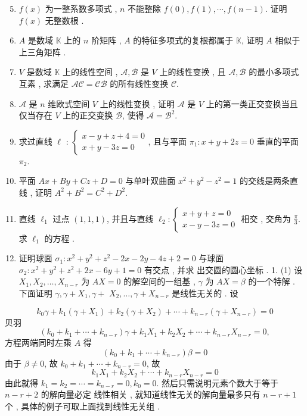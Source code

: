 \documentclass[10pt]{article}
\begin{document}
\begin{enumerate}
  \setcounter{enumi}{4}
  \item $f(x)$  为一整系数多项式 , $n$  不能整除  $f(0), f(1), \cdots, f(n-1)$.  证明  $f(x)$  无整数根 .

  \item $A$  是数域  $\mathbb{K}$  上的  $n$  阶矩阵 , $A$  的特征多项式的复根都属于  $\mathbb{K}$,  证明  $A$  相似于上三角矩阵 .

  \item $V$  是数域  $\mathbb{K}$  上的线性空间 , $\mathscr{A}, \mathscr{B}$  是  $V$  上的线性变换 ,  且  $\mathscr{A}, \mathscr{B}$  的最小多项式互素 ,  求满足  $\mathscr{A} \mathscr{C}=\mathscr{C} \mathscr{B}$  的所有线性变换  $\mathscr{C}$.

  \item $\mathscr{A}$  是  $n$  维欧式空间  $V$  上的线性变换 ,  证明  $\mathscr{A}$  是  $V$  上的第一类正交变换当且仅当存在  $V$  上的正交变换  $\mathscr{B}$,  使得  $\mathscr{A}=\mathscr{B}^{2}$.

  \item  求过直线  $\ell$ : $\left\{\begin{array}{c}x-y+z+4=0 \\ x+y-3 z=0\end{array}\right.$,  且与平面  $\pi_{1}: x+y+2 z=0$  垂直的平面  $\pi_{2}$.

  \item  平面  $A x+B y+C z+D=0$  与单叶双曲面  $x^{2}+y^{2}-z^{2}=1$  的交线是两条直线 ,  证明  $A^{2}+B^{2}=C^{2}+D^{2}$.

  \item  直线  $\ell_{1}$  过点  $(1,1,1)$,  并且与直线  $\ell_{2}:\left\{\begin{array}{c}x+y+z=0 \\ x-y-3 z=0\end{array}\right.$  相交 ,  交角为  $\frac{\pi}{3}$.  求  $\ell_{1}$  的方程 .

  \item  证明球面  $\sigma_{1}: x^{2}+y^{2}+z^{2}-2 x-2 y-4 z+2=0$  与球面  $\sigma_{2}: x^{2}+y^{2}+z^{2}+2 x-6 y+1=0$  有交点 ,  并求   出交圆的圆心坐标 . 1. (1)  设  $X_{1}, X_{2}, \ldots, X_{n-r}$  为  $A X=0$  的解空间的一组基 , $\gamma$  为  $A X=\beta$  的一个特解 .  下面证明  $\gamma, \gamma+X_{1}, \gamma+$ $X_{2}, \ldots, \gamma+X_{n-r}$  是线性无关的 .  设 

\end{enumerate}
$$
k_{0} \gamma+k_{1}\left(\gamma+X_{1}\right)+k_{2}\left(\gamma+X_{2}\right)+\cdots+k_{n-r}\left(\gamma+X_{n-r}\right)=0
$$
 贝羽 
$$
\left(k_{0}+k_{1}+\cdots+k_{n-r}\right) \gamma+k_{1} X_{1}+k_{2} X_{2}+\cdots+k_{n-r} X_{n-r}=0,
$$
 方程两端同时左乘  $A$  得 
$$
\left(k_{0}+k_{1}+\cdots+k_{n-r}\right) \beta=0
$$
 由于  $\beta \neq 0$,  故  $k_{0}+k_{1}+\cdots+k_{n-r}=0$,  故 
$$
k_{1} X_{1}+k_{2} X_{2}+\cdots+k_{n-r} X_{n-r}=0
$$
 由此就得  $k_{1}=k_{2}=\cdots=k_{n-r}=0, k_{0}=0$.  然后只需说明元素个数大于等于  $n-r+2$  的解向量必定   线性相关 ,  就知道线性无关的解向量最多只有  $n-r+1$  个 ,  具体的例子可取上面找到线性无关组 .
\end{document}
